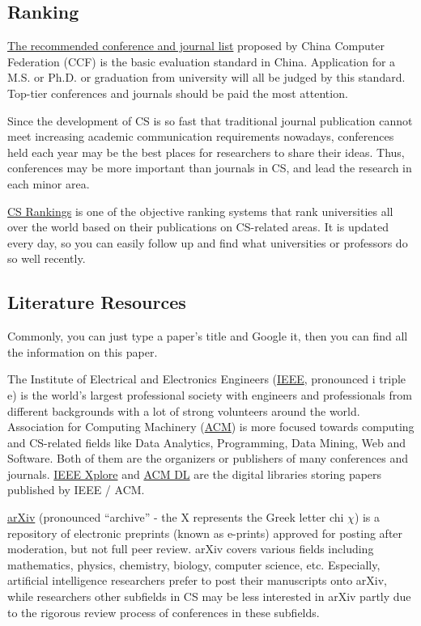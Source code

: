 \documentclass[english]{../TexTemplate/thesis}
\begin{document}
\subsection{Ranking}
\href{https://www.ccf.org.cn/xspj/gyml/}{The recommended conference and journal list} proposed by China Computer Federation (CCF) is the basic evaluation standard in China. Application for a M.S. or Ph.D. or graduation from university will all be judged by this standard. Top-tier conferences and journals should be paid the most attention.

Since the development of CS is so fast that traditional journal publication cannot meet increasing academic communication requirements nowadays, conferences held each year may be the best places for researchers to share their ideas. Thus, conferences may be more important than journals in CS, and lead the research in each minor area.

\href{http://csrankings.org/\#/index?all}{CS Rankings} is one of the objective ranking systems that rank universities all over the world based on their publications on CS-related areas.
It is updated every day, so you can easily follow up and find what universities or professors do so well recently.

\subsection{Literature Resources}
Commonly, you can just type a paper's title and Google it, then you can find all the information on this paper.

The Institute of Electrical and Electronics Engineers (\href{https://www.ieee.org/}{IEEE}, pronounced i triple e) is the world's largest professional society with engineers and professionals from different backgrounds with a lot of strong volunteers around the world. Association for Computing Machinery (\href{https://www.acm.org}{ACM}) is more focused towards computing and CS-related fields like Data Analytics, Programming, Data Mining, Web and Software. Both of them are the organizers or publishers of many conferences and journals.
\href{https://ieeexplore.ieee.org/Xplore/home.jsp}{IEEE Xplore} and \href{https://dl.acm.org/}{ACM DL} are the digital libraries storing papers published by IEEE / ACM.

\href{https://arxiv.org/}{arXiv} (pronounced ``archive'' - the X represents the Greek letter chi $\chi$) is a repository of electronic preprints (known as e-prints) approved for posting after moderation, but not full peer review.
arXiv covers various fields including mathematics, physics, chemistry, biology, computer science, etc.
Especially, artificial intelligence researchers prefer to post their manuscripts onto arXiv, while researchers other subfields in CS may be less interested in arXiv partly due to the rigorous review process of conferences in these subfields.
\end{document}
